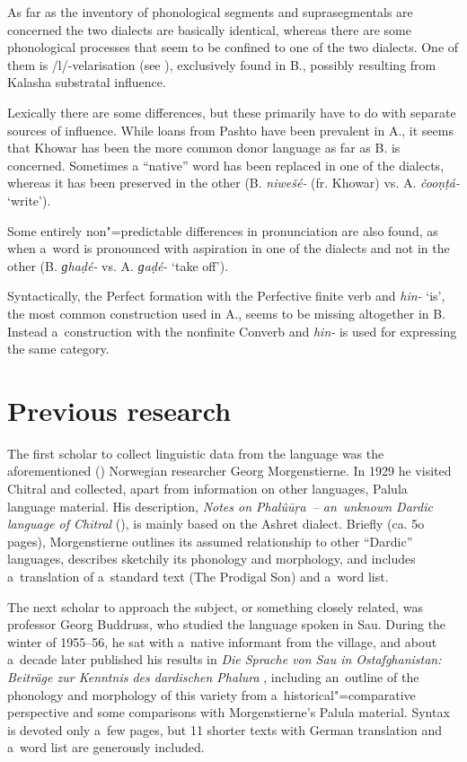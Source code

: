 As far as the inventory of phonological segments and suprasegmentals are concerned the two dialects
are basically identical, whereas there are some phonological processes that seem to be confined to
one of the two dialects. One of them is /l/-velarisation (see ), exclusively
found in B., possibly resulting from Kalasha substratal influence.


Lexically there are some differences, but these primarily have to do with separate sources of influence. While loans from Pashto have been prevalent in A., it seems that Khowar has been the more common donor language as far as B. is concerned. Sometimes a ``native'' word has been replaced in one of the dialects, whereas it has been preserved in the other (B. \textit{niwešé-} (fr. Khowar) vs. A. \textit{čooṇṭá-} `write'). 


Some entirely non"=predictable differences in pronunciation are also found, as when a~word is pronounced with aspiration in one of the dialects and not in the other (B. \textit{ɡhaḍé-} vs. A. \textit{ɡaḍé-} `take off').


Syntactically, the Perfect formation with the Perfective finite verb and \textit{hin-} `is', the most common construction used in A., seems to be missing altogether in B. Instead a~construction with the nonfinite Converb and \textit{hin-} is used for expressing the same category.


\section{Previous research}
\label{sec:1-5}

The first scholar to collect linguistic data from the language was the aforementioned
() Norwegian researcher Georg Morgenstierne. In 1929 he visited Chitral and
collected, apart from information on other languages, Palula language material. His description,
\textit{Notes on Phalû\=uṛa~-- an~unknown Dardic language of Chitral}
(\citeyear{morgenstierne1941}), is mainly based on the Ashret dialect. Briefly (ca. 5o pages),
Morgenstierne outlines its assumed relationship to other ``Dardic'' languages, describes sketchily its
phonology and morphology, and includes a~translation of a~standard text (The Prodigal Son) and
a~word list.


The next scholar to approach the subject, or something closely related, was professor Georg
Buddruss, who studied the language spoken in Sau. During the winter of 1955--56, he sat with a~native
informant from the village, and about a~decade later published his results in \textit{Die Sprache
  von Sau in Ostafghanistan: Beiträge zur Kenntnis des dardischen Phalura} \citep{buddruss1967},
including an~outline of the phonology and morphology of this variety from a~historical"=comparative
perspective and some comparisons with Morgenstierne's Palula material. Syntax is devoted only a~few
pages, but 11 shorter texts with German translation and a~word list are generously included.


